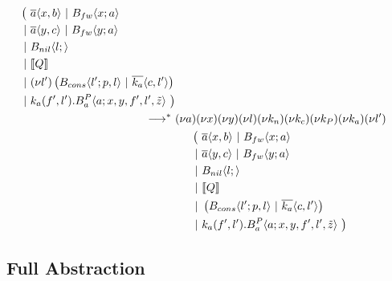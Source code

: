 \begin{align*}
\begin{aligned}[t]
{{{{{{{{      \begin{aligned}[t]
        \big(\ &\asnd{a}{x,b} \apar \ains{B_{fw}}{x}{a} \\
        \apar  &\asnd{a}{y,c} \apar \ains{B_{fw}}{y}{a} \\
        \apar  &\ains{B_{nil}}{l}{} \\
        \apar  &\encMJtoAP{Q} \\
        \apar  &\anew{l'}{\parens{\ains{B_{cons}}{l'}{p, l} \apar \asnd{k_a}{c, l'}}} \\
        \apar  &\arcv{k_a}{f',l'} . \ains{B_a^P}{a}{x, y, f', l',\tilde{z}}
        \ \big)
      \end{aligned}
    }}}}}}}}
    \\
    \apireduction{}^*\ &
    \anew{a}{\anew{x}{\anew{y}{\anew{l}{\anew{k_n}{\anew{k_c}{\anew{k_P}{\anew{k_a}{\anew{l'}{ \\
      &\hspace{0.5cm}
      \begin{aligned}[t]
        \big(\ &\asnd{a}{x,b} \apar \ains{B_{fw}}{x}{a} \\
        \apar  &\asnd{a}{y,c} \apar \ains{B_{fw}}{y}{a} \\
        \apar  &\ains{B_{nil}}{l}{} \\
        \apar  &\encMJtoAP{Q} \\
        \apar  &\parens{\ains{B_{cons}}{l'}{p, l} \apar \asnd{k_a}{c, l'}} \\
        \apar  &\arcv{k_a}{f',l'} . \ains{B_a^P}{a}{x, y, f', l',\tilde{z}}
        \ \big)
      \end{aligned}
    }}}}}}}}}
  \end{aligned}
\end{align*}



\subsection{Full Abstraction}


